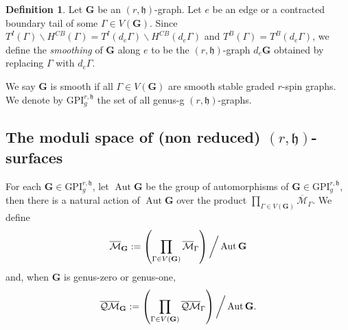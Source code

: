 \documentclass[11pt,a4paper]{article}
\theoremstyle{definition}
\newtheorem{dfn}[dummy]{Definition}
\theoremstyle{remark}
\newcommand{\oQMb}{{\overline{\mathcal{QM}}}}
\numberwithin{equation}{section}
\def\Mbar{{\overline{\mathcal M}}}
\def\GPI{{\text{GPI}}}
\def\h{{\mathfrak h}}
\begin{document}
\begin{dfn}
Let $\mathbf{G}$ be an $(r,\h)$-graph. Let $e$ be an edge or a contracted boundary tail of some $\Gamma\in V(\mathbf{G})$. Since $T^I(\Gamma)\backslash H^{CB}(\Gamma)=T^I(d_e \Gamma)\backslash H^{CB}(d_e \Gamma)$ and $T^B(\Gamma)=T^B(d_e \Gamma)$, we define the \textit{smoothing} of $\mathbf{G}$ along $e$ to be the $(r,\h)$-graph $d_e \mathbf{G}$ obtained by replacing $\Gamma$ with $d_e \Gamma$.


We say $\mathbf{G}$ is smooth if all $\Gamma\in V(\mathbf{G})$ are smooth stable graded $r$-spin graphs.
We denote by $\GPI^{r,\h}_g$ the set of all genus-g $(r,\h)$-graphs.
\end{dfn}






\subsection{The moduli space of (non reduced) $(r,\h)$-surfaces}


For each $\mathbf{G}\in \GPI^{r,\h}_g$, let $\operatorname{Aut} \mathbf{G}$ be the group of automorphisms of $\mathbf{G}\in \GPI^{r,\h}_g$, then there is a natural action of $\operatorname{Aut} \mathbf{G}$ over the product $\prod_{\Gamma\in V(\mathbf{G})} \Mbar_\Gamma$. We define
$$
\Mbar_\mathbf{G}:=\left(\prod_{\Gamma\in V(\mathbf{G})} \Mbar_\Gamma\right)\bigg\slash \operatorname{Aut} \mathbf{G}
$$
and, when $\bm{G}$ is genus-zero or genus-one, 
$$
\oQMb_\mathbf{G}:=\left(\prod_{\Gamma\in V(\mathbf{G})} \oQMb_\Gamma\right)\bigg\slash \operatorname{Aut} \mathbf{G}.
$$
\end{document}
